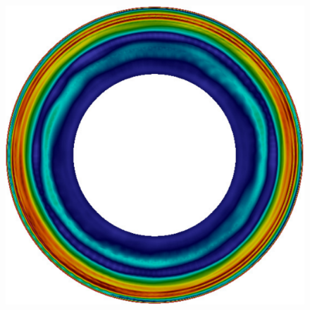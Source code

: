 \documentclass[extra]{gji}
\begin{document}
\begin{figure}
\begin{minipage}{0.6\textwidth}
\begin{minipage}{.39\textwidth}
      \label{fig:1dsl}    
    \end{minipage}\\
    \begin{minipage}{.585\textwidth}
      \centering
      \vspace{1em}
      \includegraphics[height=.85\textwidth]{fig/snapshot/3d-phi.pdf}
      \label{fig:3deq}  
    \end{minipage}
    \begin{minipage}{.39\textwidth}
      \centering
      \vspace{1em}

\end{minipage}
\end{minipage}
\end{figure}
\end{document}

